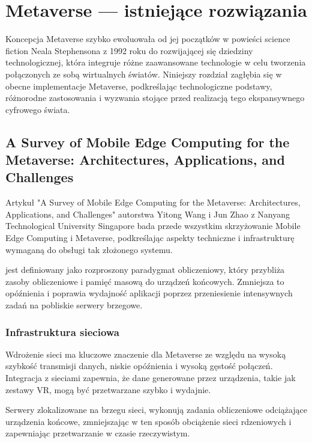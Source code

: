 \chapter{Metaverse --- istniejące rozwiązania}

Koncepcja Metaverse szybko ewoluowała od jej początków w powieści science fiction Neala Stephensona  z 1992 roku do rozwijającej się dziedziny technologicznej, która integruje różne zaawansowane technologie w celu tworzenia połączonych ze sobą wirtualnych światów. Niniejszy rozdział zagłębia się w obecne implementacje Metaverse, podkreślając technologiczne podstawy, różnorodne zastosowania i wyzwania stojące przed realizacją tego ekspansywnego cyfrowego świata.

\section{A Survey of Mobile Edge Computing for the
Metaverse: Architectures, Applications, and
Challenges}

Artykuł "A Survey of Mobile Edge Computing for the Metaverse: Architectures, Applications, and Challenges" autorstwa Yitong Wang i Jun Zhao z Nanyang Technological University Singapore bada przede wszystkim skrzyżowanie Mobile Edge Computing  i Metaverse, podkreślając aspekty techniczne i infrastrukturę wymaganą do obsługi tak złożonego systemu.

 jest definiowany jako rozproszony paradygmat obliczeniowy, który przybliża zasoby obliczeniowe i pamięć masową do urządzeń końcowych. Zmniejsza to opóźnienia i poprawia wydajność aplikacji poprzez przeniesienie intensywnych zadań na pobliskie serwery brzegowe.

\subsection{Infrastruktura sieciowa}

Wdrożenie sieci  ma kluczowe znaczenie dla Metaverse ze względu na wysoką szybkość transmisji danych, niskie opóźnienia i wysoką gęstość połączeń. Integracja  z sieciami  zapewnia, że dane generowane przez urządzenia, takie jak zestawy VR, mogą być przetwarzane szybko i wydajnie.

Serwery zlokalizowane na brzegu sieci, wykonują zadania obliczeniowe odciążające urządzenia końcowe, zmniejszając w ten sposób obciążenie sieci rdzeniowych i zapewniając przetwarzanie w czasie rzeczywistym.

